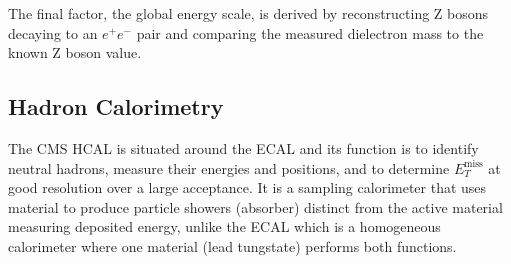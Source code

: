 The final factor, the global energy scale, is derived by reconstructing Z bosons decaying to an $e^{+}e^{-}$ pair and comparing the measured dielectron mass to the known Z boson value.














\subsection{Hadron Calorimetry}
The CMS HCAL \cite{cmsHcal} is situated around the ECAL and its function is to identify neutral hadrons, measure their energies and positions, and to determine $E_{T}^{\mathrm{miss}}$ at good resolution over a large acceptance.
It is a sampling calorimeter that uses material to produce particle showers (absorber) distinct from the active material measuring deposited energy, unlike the ECAL which is a homogeneous calorimeter where one material (lead tungstate) performs both functions. 

